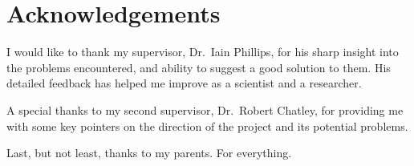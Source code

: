 
\chapter{Acknowledgements} %

\label{Acknowledgements} %


I would like to thank my supervisor, Dr.\ Iain Phillips, for his sharp insight into the problems encountered, and ability to suggest a good solution to them. His detailed feedback has helped me improve as a scientist and a researcher.

A special thanks to my second supervisor, Dr.\ Robert Chatley, for providing me with some key pointers on the direction of the project and its potential problems.

Last, but not least, thanks to my parents. For everything.

